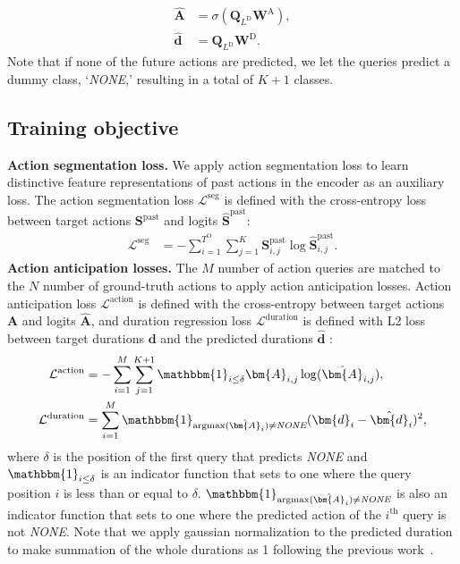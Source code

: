 \begin{align}
    \hat{\bm{A}}&=\sigma(\bm{Q}_{L^{\mathrm{D}}}\bm{W}^\mathrm{A}),
    \\
    \hat{\bm{d}}&=\bm{Q}_{L^{\mathrm{D}}}\bm{W}^\mathrm{D}.
\end{align}
Note that if none of the future actions are predicted, we let the queries predict a dummy class, `\textit{NONE},' resulting in a total of $K+1$ classes.

\subsection{Training objective}
\label{sec:4.3}
\noindent \textbf{Action segmentation loss.}
We apply action segmentation loss to learn distinctive feature representations of past actions in the encoder as an auxiliary loss.
The action segmentation loss $\mathcal{L}^{\mathrm{seg}}$ is defined with the cross-entropy loss between target actions $\bm{S}^{\mathrm{past}}$ and logits $\hat{\bm{S}}^{\mathrm{past}}$:
\begin{align}
    \mathcal{L}^{\mathrm{seg}} &= -\sum^{T^\mathrm{O}}_{i=1}\sum^{K}_{j=1} \bm{S}^{\mathrm{past}}_{i,j}\log\hat{\bm{S}}^{\mathrm{past}}_{i,j}.
\end{align}
\noindent 
\textbf{Action anticipation losses.}
The $M$ number of action queries are matched to the $N$ number of ground-truth actions to apply action anticipation losses.
Action anticipation loss $\mathcal{L}^{\mathrm{action}}$ is defined with the cross-entropy between target actions $\bm{A}$ and logits $\hat{\bm{A}}$, and duration regression loss $\mathcal{L}^{\mathrm{duration}}$ is defined with L2 loss between target durations $\bm{d}$ and the predicted durations $\hat{\bm{d}}$ :
\begin{align}
    \mathcal{L}^{\mathrm{action}} &= - \sum^{M}_{i=1} \sum^{K+1}_{j=1} \mathbbm{1}_{i \leq \delta} \bm{A}_{i,j}\log(\hat{\bm{A}}_{i,j}),
    \\
    \mathcal{L}^{\mathrm{duration}} &= \sum^M_{i=1} \mathbbm{1}_{\mathrm{argmax}(\hat{\bm{A}}_i) \neq \mathrm{\textit{NONE}}} ( \bm{d}_{i} - \hat{\bm{d}}_i )^2,
\end{align}
where $\delta$ is the position of the first query that predicts \textit{NONE} and $\mathbbm{1}_{i \leq \delta}$ is an indicator function that sets to one where the query position $i$ is less than or equal to $\delta$.
$\mathbbm{1}_{\mathrm{argmax}(\hat{\bm{A}}_i) \neq \mathrm{\textit{NONE}}}$ is also an indicator function that sets to one where the predicted action of the $i^{\mathrm{th}}$ query is not \textit{NONE}.
Note that we apply gaussian normalization to the predicted duration to make summation of the whole durations as 1 following the previous work~\cite{abu2018will,farha2020long}.

